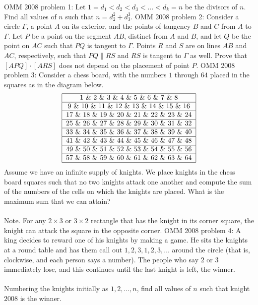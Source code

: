 OMM 2008 problem 1:  Let $1=d_1<d_2<d_3<\dots<d_k=n$ be the divisors of $n$. Find all values of $n$ such that $n=d_2^2+d_3^3$. 
OMM 2008 problem 2:  Consider a circle $\Gamma$, a point $A$ on its exterior, and the points of tangency $B$ and $C$ from $A$ to $\Gamma$. Let $P$ be a point on the segment $AB$, distinct from $A$ and $B$, and let $Q$ be the point on $AC$ such that $PQ$ is tangent to $\Gamma$. Points $R$ and $S$ are on lines $AB$ and $AC$, respectively, such that $PQ\parallel RS$ and $RS$ is tangent to $\Gamma$ as well. Prove that $[APQ]\cdot[ARS]$ does not depend on the placement of point $P$. 
OMM 2008 problem 3:  Consider a chess board, with the numbers $1$ through $64$ placed in the squares as in the diagram below.
\[
\begin{tabular}{| c | c | c | c | c | c | c | c |}
\hline
1 \& 2 \& 3 \& 4 \& 5 \& 6 \& 7 \& 8 \\
\hline
9 \& 10 \& 11 \& 12 \& 13 \& 14 \& 15 \& 16 \\
\hline
17 \& 18 \& 19 \& 20 \& 21 \& 22 \& 23 \& 24 \\
\hline
25 \& 26 \& 27 \& 28 \& 29 \& 30 \& 31 \& 32 \\
\hline
33 \& 34 \& 35 \& 36 \& 37 \& 38 \& 39 \& 40 \\
\hline
41 \& 42 \& 43 \& 44 \& 45 \& 46 \& 47 \& 48 \\
\hline
49 \& 50 \& 51 \& 52 \& 53 \& 54 \& 55 \& 56 \\
\hline
57 \& 58 \& 59 \& 60 \& 61 \& 62 \& 63 \& 64 \\
\hline
\end{tabular}
\]
Assume we have an infinite supply of knights. We place knights in the chess board squares such that no two knights attack one another and compute the sum of the numbers of the cells on which the knights are placed. What is the maximum sum that we can attain? \\\\
Note. For any $2\times3$ or $3\times2$ rectangle that has the knight in its corner square, the knight can attack the square in the opposite corner. 
OMM 2008 problem 4:  A king decides to reward one of his knights by making a game. He sits the knights at a round table and has them call out $1,2,3,1,2,3,\dots$ around the circle (that is, clockwise, and each person says a number). The people who say $2$ or $3$ immediately lose, and this continues until the last knight is left, the winner. \\\\
Numbering the knights initially as $1,2,\dots,n$, find all values of $n$ such that knight $2008$ is the winner. 
